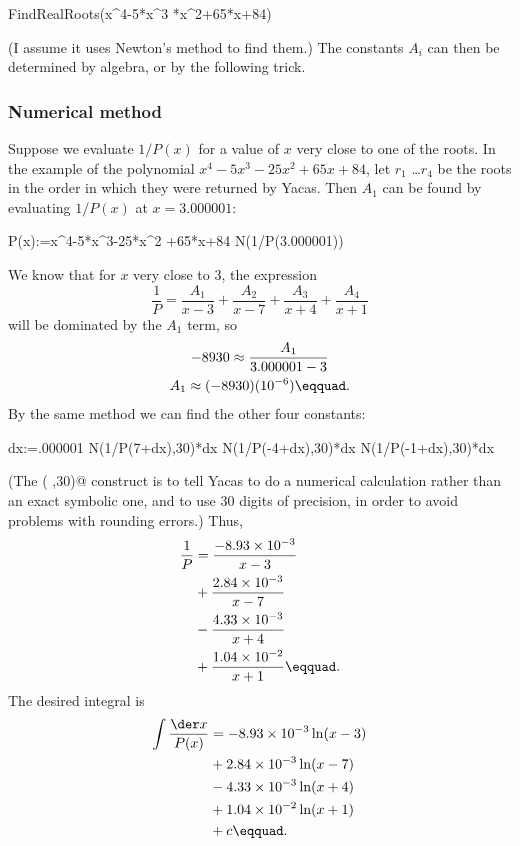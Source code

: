 \begin{Code}
  \ii FindRealRoots(x^4-5*x^3
  *x^2+65*x+84)
\end{Code}

(I assume it uses Newton's method to find them.) The constants
$A_i$ can then be determined by algebra, or by the following trick.

\subsubsection{Numerical method}\label{partial-fractions-numerical}
Suppose we evaluate
$1/P(x)$ for a value of $x$ very close to one of the roots.
In the example of the polynomial 
$x^4-5x^3-25x^2+65x+84$, let $r_1$ \ldots $r_4$ be the roots in the
order in which they were returned by Yacas. Then $A_1$ can be
found by evaluating $1/P(x)$ at $x=3.000001$:\label{residue-method-numerical}

\begin{Code}
  \ii P(x):=x^4-5*x^3-25*x^2
  \ii   +65*x+84
  \ii N(1/P(3.000001))
\end{Code}

We know that for $x$ very close to 3, the expression
\begin{equation*}
  \frac{1}{P} = \frac{A_1}{x-3}+\frac{A_2}{x-7}+\frac{A_3}{x+4}+\frac{A_4}{x+1}
\end{equation*}
will be dominated by the $A_1$ term, so
\begin{gather*}
  -8930 \approx \frac{A_1}{3.000001-3} \\
  A_1 \approx (-8930)(10^{-6})\eqquad.
\end{gather*}
By the same method we can find the other four constants:
\begin{Code}
  \ii dx:=.000001
  \ii N(1/P(7+dx),30)*dx
  \ii N(1/P(-4+dx),30)*dx
  \ii N(1/P(-1+dx),30)*dx
\end{Code}
(The \verb@N( ,30)@ construct is to tell Yacas to do a numerical calculation rather than an exact
symbolic one, and to use 30 digits of precision, in order to
avoid problems with rounding errors.) Thus, \begin{align*}
  \frac{1}{P} &= \frac{-8.93\times10^{-3}}{x-3} \\
              &+ \frac{2.84\times10^{-3}}{x-7} \\
              &- \frac{4.33\times10^{-3}}{x+4} \\
              &+ \frac{1.04\times10^{-2}}{x+1}\eqquad.
\end{align*}
The desired integral is
\begin{align*}
  \int \frac{\der x}{P(x)} &= -8.93\times10^{-3}\ln(x-3) \\
              & +2.84\times10^{-3}\ln(x-7) \\
              & -4.33\times10^{-3}\ln(x+4) \\
              &+ 1.04\times10^{-2}\ln(x+1) \\
              &+c\eqquad.
\end{align*}

